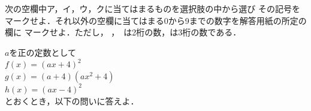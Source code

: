 \documentclass[../../../uem_mei_q.tex]{subfiles}
\begin{document}
    次の空欄中\textsf{ア}，\textsf{イ}，\textsf{ウ}，\textsf{ク}に当てはまるものを選択肢の中から選び%
    その記号をマークせよ．それ以外の空欄に当てはまる0から9までの数字を解答用紙の所定の欄に%
    マークせよ．ただし，\,\,，%
    \,\:は2桁の数，\:は3桁の数である．

    \vspace{.5\baselineskip}
    $a$を正の定数として\\
    \hspace{3\zw}%
    $\displaystyle%
        f(x)=(ax+4)^2%
    $\\
    \hspace{3\zw}%
    $\displaystyle%
        g(x)=(a+4)(ax^2+4)%
    $\\
    \hspace{3\zw}%
    $\displaystyle%
        h(x)=(ax-4)^2%
    $\\
    とおくとき，以下の問いに答えよ．
\end{document}
